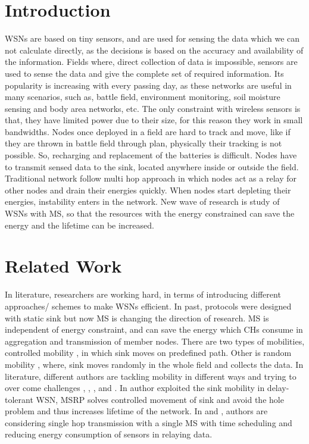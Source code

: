 \documentclass[conference]{IEEEtran}
\begin{document}
\section{Introduction}
WSNs are based on tiny sensors, and are used for sensing the data which we can not calculate directly, as the decisions is based on the accuracy and availability of the information. Fields where, direct collection of data is impossible, sensors are used to sense the data and give the complete set of required information. Its popularity is increasing with every passing day, as these networks are useful in many scenarios, such as, battle field, environment monitoring, soil moisture sensing and body area networks, etc. The only constraint with wireless sensors is that, they have limited power due to their size, for this reason they work in small bandwidths. Nodes once deployed in a field are hard to track and move, like if they are thrown in battle field through plan, physically their tracking is not possible. So, recharging and replacement of the batteries is difficult. Nodes have to transmit sensed data to the sink, located anywhere inside or outside the field. Traditional network follow multi hop approach in which nodes act as a relay for other nodes and drain their energies quickly. When nodes start depleting their energies, instability enters in the network. New wave of research is study of WSNs with MS, so that the resources with the energy constrained can save the energy and the lifetime can be increased.

\section{Related Work}
In literature, researchers are working hard, in terms of introducing different approaches/ schemes to make WSNs efficient. In past, protocols were designed with static sink but now MS is changing the direction of research. MS is independent of energy constraint, and can save the energy which CHs consume in aggregation and transmission of member nodes. There are two types of mobilities, controlled mobility \cite {1}, in which sink  moves on predefined path. Other is random mobility \cite {2}, where, sink moves randomly in the whole field and collects the data. In literature, different authors are tackling mobility in different ways and trying to over come challenges \cite {3}, \cite {4}, \cite {5}, \cite {6} and \cite {7}. In \cite {8} author exploited the sink mobility in delay-tolerant WSN, \cite {7} MSRP solves controlled movement of sink and avoid the hole problem and thus increases lifetime of the network. In \cite {9} and \cite {10}, authors are considering single hop transmission with a single MS with time scheduling and reducing energy consumption of sensors in relaying data.
\end{document}
